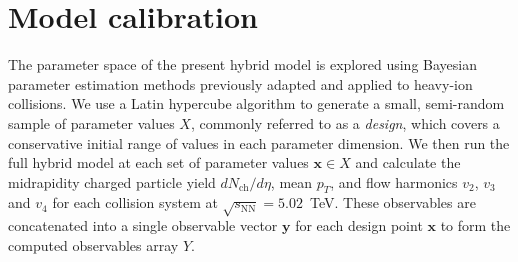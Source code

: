 \documentclass[3p,times,procedia,sort&compress]{elsarticle}
\newcommand{\sqrts}{\sqrt{s_\mathrm{NN}}}
\begin{document}
\section{Model calibration}

The parameter space of the present hybrid model is explored using Bayesian parameter estimation methods previously adapted and applied to heavy-ion collisions.
We use a Latin hypercube algorithm to generate a small, semi-random sample of parameter values $X$, commonly referred to as a \emph{design}, which covers a conservative initial range of values in each parameter dimension.
We then run the full hybrid model at each set of parameter values $\mathbf{x} \in X$ and calculate the midrapidity charged particle yield $dN_\text{ch}/d\eta$, mean $p_T$, and flow harmonics $v_2$, $v_3$ and $v_4$ for each collision system at $\sqrts=5.02$~TeV.
These observables are concatenated into a single observable vector $\mathbf{y}$ for each design point $\mathbf{x}$ to form the computed observables array $Y$.
\end{document}
